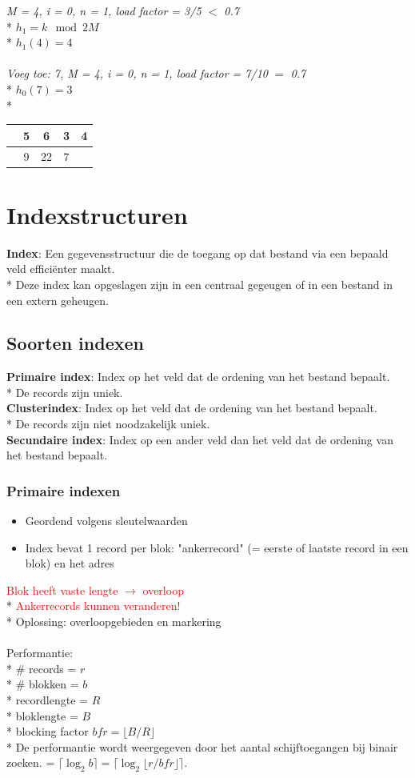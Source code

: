 \documentclass[10pt]{article}
\begin{document}
\textit{M = 4, i = 0, n = 1, load factor = 3/5 $<$ 0.7}\\*
\textit{$h_1 = k\mod{2M}$}\\*
\textit{$h_1(4) = 4$}\\\\
\textit{Voeg toe: 7, M = 4, i = 0, n = 1, load factor = 7/10 $=$ 0.7}\\*
\textit{$h_0(7) = 3$}\\*
\begin{tabular}{| c | c | c | c | c |} \hline
   & 5 & 6 & 3 & 4\\ \hline
   & 9 & 22 & 7 & \\ \hline
\end{tabular}
\section{Indexstructuren}
\textbf{Index}: Een gegevensstructuur die de toegang op dat bestand via een bepaald veld effici\"enter maakt.\\*
Deze index kan opgeslagen zijn in een centraal gegeugen of in een bestand in een extern geheugen.
\subsection{Soorten indexen}
\textbf{Primaire index}: Index op het veld dat de ordening van het bestand bepaalt.\\*
De records zijn uniek.\\
\textbf{Clusterindex}: Index op het veld dat de ordening van het bestand bepaalt.\\*
De records zijn niet noodzakelijk uniek.\\
\textbf{Secundaire index}: Index op een ander veld dan het veld dat de ordening van het bestand bepaalt.
\subsubsection{Primaire indexen}
\begin{itemize}
\item Geordend volgens sleutelwaarden
\item Index bevat 1 record per blok: "ankerrecord" (= eerste of laatste record in een blok) en het adres
\end{itemize}
\textcolor{red}{Blok heeft vaste lengte $\rightarrow$ overloop}\\*
\textcolor{red}{Ankerrecords kunnen veranderen!}\\*
Oplossing: overloopgebieden en markering\\\\
Performantie:\\*
$\#$ records = $r$\\*
$\#$ blokken = $b$\\*
recordlengte = $R$\\*
bloklengte = $B$\\*
blocking factor $bfr = \lfloor B/R \rfloor$\\*
De performantie wordt weergegeven door het aantal schijftoegangen bij binair zoeken. = $\lceil \log_2{b} \rceil = \lceil \log_2{\lfloor r/bfr \rfloor} \rceil$.
\end{document}
